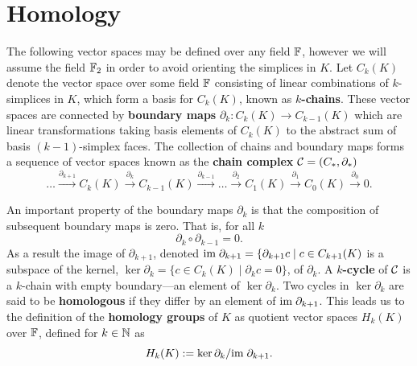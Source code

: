 \section{Homology} %
\label{sec:homology}

%

The following vector spaces may be defined over any field $\mathbb{F}$, however we will assume the field $\mathbb{F}_2$ in order to avoid orienting the simplices in $K$.
Let $C_k(K)$ denote the vector space over some field $\mathbb{F}$ consisting of linear combinations of $k$-simplices in $K$, which form a basis for $C_k(K)$, known as \textbf{$k$-chains}.
These vector spaces are connected by \textbf{boundary maps} $\partial_k:C_k(K)\to C_{k-1}(K)$ which are linear transformations taking basis elements of $C_k(K)$ to the abstract sum of basis $(k-1)$-simplex faces.
The collection of chains and boundary maps forms a sequence of vector spaces known as the \textbf{chain complex} $\mathcal{C} = (C_*,\partial_*)$
\[
    \ldots\xrightarrow{\partial_{k+1}}
    C_k(K)\xrightarrow{\partial_{k}}
    C_{k-1}(K)\xrightarrow{\partial_{k-1}}
    \ldots\xrightarrow{\partial_2}
    C_1(K)\xrightarrow{\partial_{1}}
    C_0(K)\xrightarrow{\partial_0} 0.
\]

An important property of the boundary maps $\partial_k$ is that the composition of subsequent boundary maps is zero.
That is, for all $k$
\[
  \partial_k\circ\partial_{k-1} = 0.
\]
As a result the image of $\partial_{k+1}$, denoted $\mathrm{im}\;\partial_{k+1} = \{\partial_{k+1}c\mid c\in C_{k+1}(K)$ is a subspace of the kernel, $\ker\partial_k = \{c\in C_k(K)\mid \partial_k c = 0\}$, of $\partial_k$.
A \textbf{$k$-cycle} of $\mathcal{C}$ is a $k$-chain with empty boundary---an element of $\ker\partial_k$.
Two cycles in $\ker\partial_k$ are said to be \textbf{homologous} if they differ by an element of $\mathrm{im}\;\partial_{k+1}$.
This leads us to the definition of the \textbf{homology groups} of $K$ as quotient vector spaces $H_k(K)$ over $\mathbb{F}$, defined for $k\in\mathbb{N}$ as
\[
  H_k(K) := \ker\partial_k/\mathrm{im}\;\partial_{k+1}.
\]

